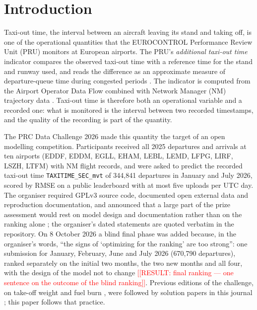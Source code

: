 \documentclass[
  manuscript=article,  %
  layout=preprint,     %
  year=2026,
  volume=4,
]{extra/joas}
\newcommand{\placeholder}[1]{\textcolor{red}{[[RESULT:#1]]}}
\begin{document}
\section{Introduction}\label{introduction}

Taxi-out time, the interval between an aircraft leaving its stand and taking off, is one of the operational quantities that the EUROCONTROL Performance Review Unit (PRU) monitors at European airports. The PRU's \emph{additional taxi-out time} indicator compares the observed taxi-out time with a reference time for the stand and runway used, and reads the difference as an approximate measure of departure-queue time during congested periods \autocite{eurocontrol2023atxot}. The indicator is computed from the Airport Operator Data Flow combined with Network Manager (NM) trajectory data \autocite{eurocontrol2023atxot}. Taxi-out time is therefore both an operational variable and a recorded one: what is monitored is the interval between two recorded timestamps, and the quality of the recording is part of the quantity.

The PRC Data Challenge 2026 \autocite{prc2026site} made this quantity the target of an open modelling competition. Participants received all 2025 departures and arrivals at ten airports (EDDF, EDDM, EGLL, EHAM, LEBL, LEMD, LFPG, LIRF, LSZH, LTFM) with NM flight records, and were asked to predict the recorded taxi-out time \texttt{TAXITIME\_\allowbreak{}SEC\_\allowbreak{}mvt} of 344,841 departures in January and July 2026, scored by RMSE on a public leaderboard with at most five uploads per UTC day. The organiser required GPLv3 source code, documented open external data and reproduction documentation, and announced that a large part of the prize assessment would rest on model design and documentation rather than on the ranking alone \autocite{prc2026site}; the organiser's dated statements are quoted verbatim in the repository. On 8 October 2026 a blind final phase was added because, in the organiser's words, ``the signs of `optimizing for the ranking' are too strong'': one submission for January, February, June and July 2026 (670,790 departures), ranked separately on the initial two months, the two new months and all four, with the design of the model not to change \placeholder{ final ranking --- one sentence on the outcome of the blind ranking}. Previous editions of the challenge, on take-off weight \autocite{spinielli2025atow} and fuel burn \autocite{sun2026fuel}, were followed by solution papers in this journal \autocite{murca2025atow,grigoriou2026fuel,kacar2026fuel}; this paper follows that practice.
\end{document}
